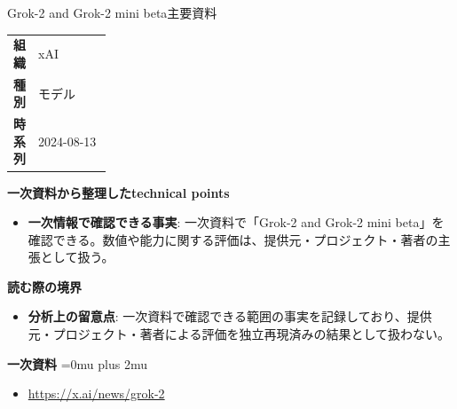 \begin{technicalnote}{Grok-2 and Grok-2 mini beta}{主要資料}
\begingroup
\begin{tabularx}{\linewidth}{@{}>{\bfseries}p{0.22\linewidth}X@{}}
組織 & xAI \\
種別 & モデル \\
時系列 & 2024-08-13 \\
\end{tabularx}
\smallskip
{\bfseries 一次資料から整理したtechnical points}
\begin{itemize}[leftmargin=1.5em,itemsep=0.35em]
\item \textbf{一次情報で確認できる事実}: 一次資料で「Grok-2 and Grok-2 mini beta」を確認できる。数値や能力に関する評価は、提供元・プロジェクト・著者の主張として扱う。
\end{itemize}
\begin{minipage}{\linewidth}
{\bfseries 読む際の境界}
\begin{itemize}[leftmargin=1.5em,itemsep=0.35em]
\item \textbf{分析上の留意点}: 一次資料で確認できる範囲の事実を記録しており、提供元・プロジェクト・著者による評価を独立再現済みの結果として扱わない。
\end{itemize}
\begin{samepage}
{\bfseries 一次資料}
\begingroup\sloppy
\Urlmuskip=0mu plus 2mu\relax
\begin{itemize}[leftmargin=1.5em,itemsep=0.25em]
\item {\scriptsize\url{https://x.ai/news/grok-2}}
\end{itemize}
\endgroup
\end{samepage}
\end{minipage}
\endgroup
\end{technicalnote}
\medskip
